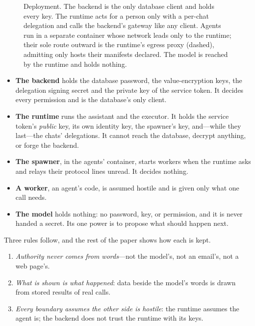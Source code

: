 \begin{figure}[t]
{}
\caption{Deployment. The backend is the only database client and holds
every key. The runtime acts for a person only with a per-chat
delegation and calls the backend's gateway like any client. Agents run
in a separate container whose network leads only to the runtime; their
sole route outward is the runtime's egress proxy (dashed), admitting only
hosts their manifests declared. The model is reached by the runtime and holds
nothing.}
\label{fig:arch}
\end{figure}

\begin{itemize}
\item \textbf{The backend} holds the database password, the
  value-encryption keys, the delegation signing secret and the private
  key of the service token. It decides every permission and is the
  database's only client.
\item \textbf{The runtime} runs the assistant and the executor. It
  holds the service token's \emph{public} key, its own identity key, the
  spawner's key, and---while they last---the chats' delegations. It
  cannot reach the database, decrypt anything, or forge the backend.
\item \textbf{The spawner}, in the agents' container, starts workers
  when the runtime asks and relays their protocol lines unread. It
  decides nothing.
\item \textbf{A worker}, an agent's code, is assumed hostile and is
  given only what one call needs.
\item \textbf{The model} holds nothing: no password, key, or
  permission, and it is never handed a secret. Its one power is to
  propose what should happen next.
\end{itemize}

\noindent Three rules follow, and the rest of the paper shows how each
is kept.
\begin{enumerate}[label=R\arabic*.,leftmargin=2em]
\item \emph{Authority never comes from words}---not the model's, not an
  email's, not a web page's.
\item \emph{What is shown is what happened}: data beside the model's
  words is drawn from stored results of real calls.
\item \emph{Every boundary assumes the other side is hostile}: the
  runtime assumes the agent is; the backend does not trust the runtime
  with its keys.
\end{enumerate}


